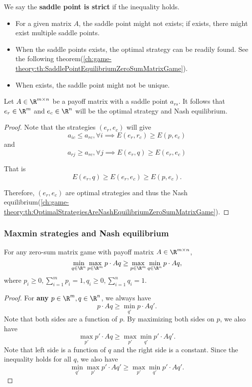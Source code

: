 \begin{refsection}
\begin{definition}
We say the \textbf{saddle point is strict} if the inequality holds.
\end{definition}

\begin{remark}\hfill
	\begin{itemize}
		\item For a given matrix $A$, the saddle point might not exists; if exists, there might exist multiple saddle points.
		\item When the saddle points exists, the optimal strategy can be readily found. See the following theorem(\autoref{ch:game-theory:th:SaddlePointEquilibriumZeroSumMatrixGame}).
		\item When exists, the saddle point might not be unique.
	\end{itemize}	
\end{remark}


\begin{theorem}\label{ch:game-theory:th:SaddlePointEquilibriumZeroSumMatrixGame}Let $A\in \R^{m\times n}$ be a payoff matrix with a saddle point $a_{rs}$. It follows that $e_r \in \R^m $ and $e_c \in \R^n$ will be the optimal strategy and Nash equilibrium. 
\end{theorem}
\begin{proof}
Note that the strategies $(e_r,e_c)$ will give
$$a_{ic}\leq a_{rc}, \forall i \implies E(e_r,r_c) \geq E(p,e_c) $$
and
$$a_{rj}\geq a_{rc}, \forall j \implies E(e_r,q) \geq E(e_r,e_c) $$

That is 
$$E(e_r,q) \geq E(e_r,e_c) \geq E(p,e_c).$$

Therefore, $(e_r,e_c)$ are optimal strategies and thus the Nash equilibrium(\autoref{ch:game-theory:th:OptimalStrategiesAreNashEquilibriumZeroSumMatrixGame}).
\end{proof}

\subsubsection{Maxmin strategies and Nash equilibrium}

\begin{lemma}
For any zero-sum matrix game with payoff matrix $A\in \R^{m\times n}$, 
$$\min_{q\in \R^n} \max_{p\in \R^m} p\cdot Aq \geq  \max_{p\in \R^m}  \min_{q\in \R^n} p\cdot Aq, $$
		where $p_i \geq 0, \sum_{i=1}^m p_i = 1,q_i \geq 0, \sum_{i=1}^n q_i = 1.$	
\end{lemma}
\begin{proof}
For \textbf{any} $p\in \R^m,q\in \R^n$, we always have
$$p\cdot Aq \geq \min_{q'} p\cdot Aq' .$$
Note that both sides are a function of $p$. By maximizing both sides on $p$, we also have
$$\max_{p'} p'\cdot Aq \geq \max_{p'} \min_{q'} p'\cdot Aq' .$$
Note that left side is a function of $q$ and the right side is a constant. Since the inequality holds for all $q$, we also have
$$\min_{q'}\max_{p'} p'\cdot Aq' \geq \max_{p'} \min_{q'} p'\cdot Aq'.$$
\end{proof}



\end{refsection}
